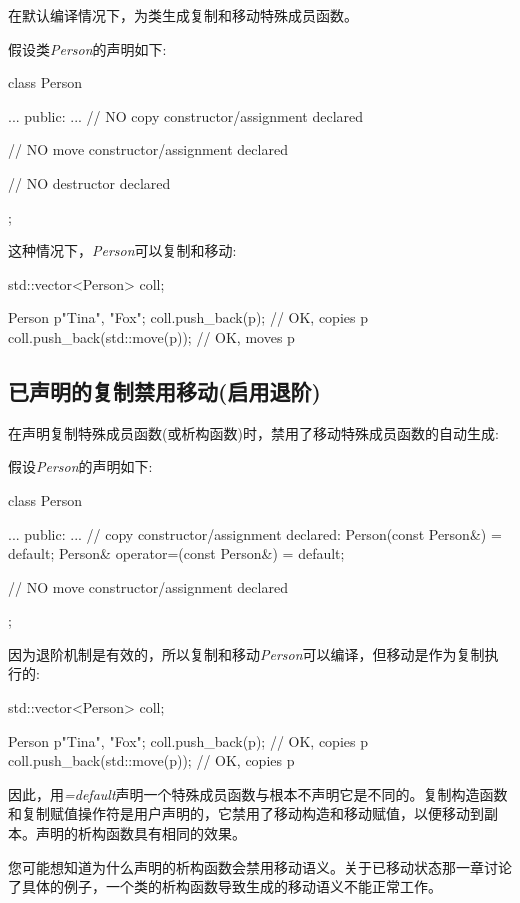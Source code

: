 在默认编译情况下，为类生成复制和移动特殊成员函数。

假设类\textit{Person}的声明如下:

\begin{cppcode}
class Person {
	...
public:
	...
	// NO copy constructor/assignment declared
	
	// NO move constructor/assignment declared
	
	// NO destructor declared
};
\end{cppcode}

这种情况下，\textit{Person}可以复制和移动:

\begin{cppcode}
std::vector<Person> coll;

Person p{"Tina", "Fox"};
coll.push_back(p); // OK, copies p
coll.push_back(std::move(p)); // OK, moves p
\end{cppcode}

\subsection{已声明的复制禁用移动(启用退阶)}

在声明复制特殊成员函数(或析构函数)时，禁用了移动特殊成员函数的自动生成:

假设\textit{Person}的声明如下:

\begin{cppcode}
class Person {
	...
public:
	...
	// copy constructor/assignment declared:
	Person(const Person&) = default;
	Person& operator=(const Person&) = default;
	
	// NO move constructor/assignment declared
};
\end{cppcode}

因为退阶机制是有效的，所以复制和移动\textit{Person}可以编译，但移动是作为复制执行的:

\begin{cppcode}
std::vector<Person> coll;

Person p{"Tina", "Fox"};
coll.push_back(p); // OK, copies p
coll.push_back(std::move(p)); // OK, copies p
\end{cppcode}

因此，用\textit{=default}声明一个特殊成员函数与根本不声明它是不同的。复制构造函数和复制赋值操作符是用户声明的，它禁用了移动构造和移动赋值，以便移动到副本。声明的析构函数具有相同的效果。

您可能想知道为什么声明的析构函数会禁用移动语义。关于已移动状态那一章讨论了具体的例子，一个类的析构函数导致生成的移动语义不能正常工作。

